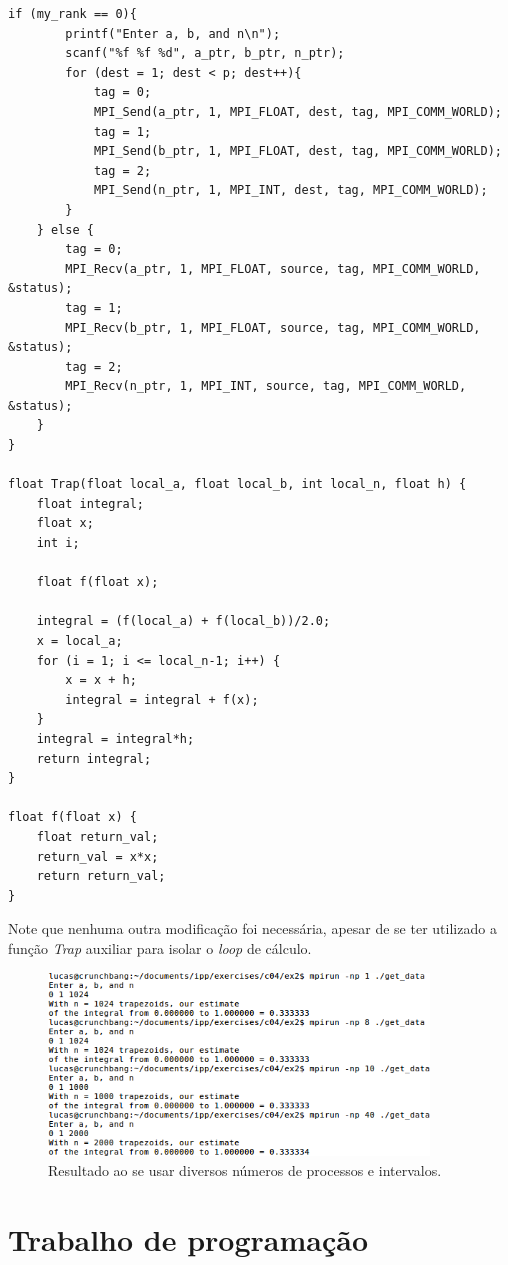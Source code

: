 \documentclass[11pt,a4paper,onecolumn]{article}
\begin{document}
\begin{lstlisting}[style=cc]
    if (my_rank == 0){
        printf("Enter a, b, and n\n");
        scanf("%f %f %d", a_ptr, b_ptr, n_ptr);
        for (dest = 1; dest < p; dest++){
            tag = 0;
            MPI_Send(a_ptr, 1, MPI_FLOAT, dest, tag, MPI_COMM_WORLD);
            tag = 1;
            MPI_Send(b_ptr, 1, MPI_FLOAT, dest, tag, MPI_COMM_WORLD);
            tag = 2;
            MPI_Send(n_ptr, 1, MPI_INT, dest, tag, MPI_COMM_WORLD);
        }
    } else {
        tag = 0;
        MPI_Recv(a_ptr, 1, MPI_FLOAT, source, tag, MPI_COMM_WORLD, &status);
        tag = 1;
        MPI_Recv(b_ptr, 1, MPI_FLOAT, source, tag, MPI_COMM_WORLD, &status);
        tag = 2;
        MPI_Recv(n_ptr, 1, MPI_INT, source, tag, MPI_COMM_WORLD, &status);
    }
}

float Trap(float local_a, float local_b, int local_n, float h) {
    float integral;
    float x; 
    int i; 

    float f(float x);

    integral = (f(local_a) + f(local_b))/2.0; 
    x = local_a; 
    for (i = 1; i <= local_n-1; i++) { 
        x = x + h; 
        integral = integral + f(x); 
    } 
    integral = integral*h; 
    return integral;
}

float f(float x) { 
    float return_val; 
    return_val = x*x;
    return return_val; 
}
\end{lstlisting}

Note que nenhuma outra modificação foi necessária, apesar de se ter utilizado a função \textit{Trap} auxiliar para isolar o \textit{loop} de cálculo.

\begin{figure}[h!]
  \centering
  \includegraphics[width=0.9\textwidth]{../ex2/SaidaEx2}
  \caption{Resultado ao se usar diversos números de processos e intervalos.}
  \label{fig:ex2}
\end{figure}

\section{Trabalho de programação}
\end{document}
